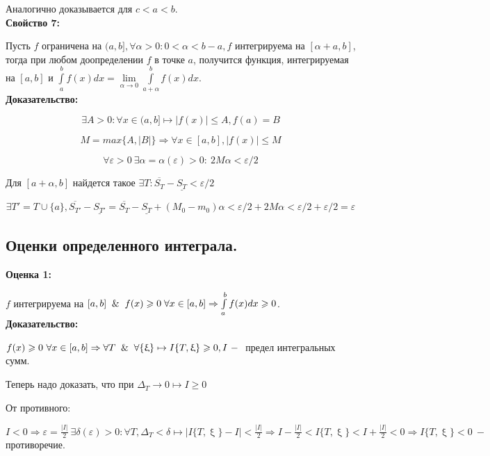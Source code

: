\documentclass[a4paper,12pt]{article} %
\renewcommand {\geq}{\geqslant}
\renewcommand {\leq}{\leqslant}
\begin{document}
Аналогично доказывается для $ c < a < b$. \\ [2mm]

\textbf{Свойство 7:}

Пусть $f$ ограничена на $(a,b], \forall \alpha > 0: 0<\alpha<b-a, f $ интегрируема на $[\alpha+a, b]$, тогда при любом доопределении $f$ в точке $a$, получится функция, интегрируемая на $[a,b]$ и $\int\limits_a^b f(x) dx = \lim \limits_{\alpha \rightarrow 0} \int\limits_{a+\alpha}^b f(x)dx$.\\

\textbf{Доказательство:}

$$\exists A>0: \forall x \in (a,b] \longmapsto |f(x)|\leq A, f(a) = B$$

$$M = max\{A, |B|\} \Rightarrow \forall x \in [a,b], |f(x)|\leq M$$

$$\forall\varepsilon > 0 ~\exists \alpha = \alpha(\varepsilon)>0:~2M\alpha< \varepsilon/2$$

Для $[a+\alpha, b]$ найдется такое  $\exists T: \overline{S_T}- \underline{S_T}< \varepsilon/2$

$$\exists T' = T \cup \{a\}, \overline{S_{T'}}- \underline{S_{T'}}= \overline{S_T}- \underline{S_T}+(M_0-m_0)\alpha<\varepsilon/2+2M\alpha<\varepsilon/2+\varepsilon/2=\varepsilon $$

\subsection{Оценки определенного интеграла.}

\textbf{Оценка 1:}

    $f$  интегрируема на $[a,b] \And f(x)\geq 0 \; \forall x \in [a,b]\Rightarrow \int\limits_a^b f(x)dx \geq 0$.\\
    
\textbf{Доказательство:}

    $f(x)\geq 0 ~ \forall x \in [a,b]\Rightarrow \forall T \And \forall \{\upxi\}\mapsto I\{T,\upxi \}\geq 0, I ~-~$ предел интегральных сумм.
    
    Теперь надо доказать, что при $\Delta_T \rightarrow 0 \mapsto I\geq 0$
    
    От противного:
    
    $I<0 \Rightarrow \varepsilon = \frac{|I|}{2} ~\exists\delta(\varepsilon)>0: \forall T, \Delta_T< \delta \mapsto |I\{T,\upxi\}-I|< \frac{|I|}{2}\Rightarrow I-\frac{|I|}{2}<I\{T,\upxi\}<I+\frac{|I|}{2}<0\Rightarrow I\{T,\upxi\}<0 ~-~ $ противоречие.\\
    
\end{document}
